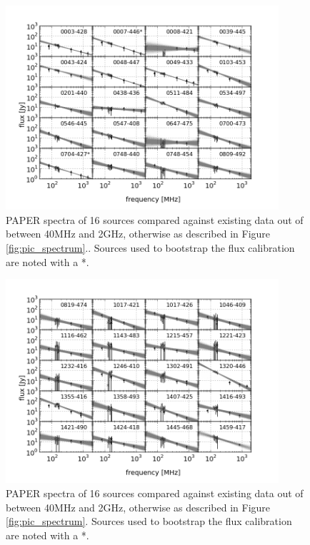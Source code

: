 \documentclass[preprint]{aastex}
\begin{document}
\begin{figure}[htbp]
\begin{center}
\includegraphics[width=0.9\textwidth]{plots/srcfig_1.png}
\end{center}
\caption{
PAPER spectra of 16 sources compared against existing data out of
\cite{Vollmer:2010p6422} between 40MHz and 2GHz, otherwise as described in
Figure \ref{fig:pic_spectrum}.\label{fig:srcs1}. Sources used to bootstrap the
flux calibration are noted with a *.
}
\end{figure}

\begin{figure}[htbp]
\begin{center}
\includegraphics[width=0.9\textwidth]{plots/srcfig_2.png}
\caption{
PAPER spectra of 16 sources compared against existing data out of
\cite{Vollmer:2010p6422} between 40MHz and 2GHz, otherwise as described in
Figure \ref{fig:pic_spectrum}.\label{fig:srcs2} Sources used to bootstrap the
flux calibration are noted with a *.
}
\end{center}
\end{figure}
\end{document}
